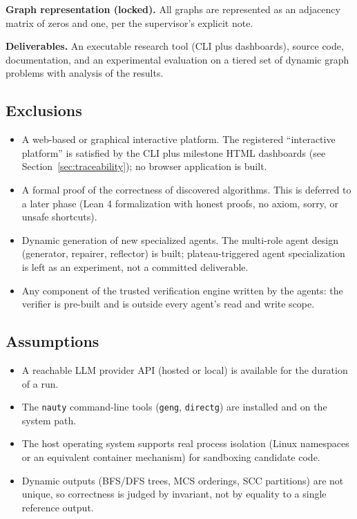 \documentclass[12pt,a4paper]{article}
\begin{document}
\textbf{Graph representation (locked).} All graphs are represented as an adjacency matrix of zeros and one, per the supervisor's explicit note.

\textbf{Deliverables.} An executable research tool (CLI plus dashboards), source code, documentation, and an experimental evaluation on a tiered set of dynamic graph problems with analysis of the results.

\subsection{Exclusions}

\begin{itemize}
  \item A web-based or graphical interactive platform. The registered ``interactive platform'' is satisfied by the CLI plus milestone HTML dashboards (see Section~\ref{sec:traceability}); no browser application is built.
  \item A formal proof of the correctness of discovered algorithms. This is deferred to a later phase (Lean 4 formalization with honest proofs, no axiom, sorry, or unsafe shortcuts).
  \item Dynamic generation of new specialized agents. The multi-role agent design (generator, repairer, reflector) is built; plateau-triggered agent specialization is left as an experiment, not a committed deliverable.
  \item Any component of the trusted verification engine written by the agents: the verifier is pre-built and is outside every agent's read and write scope.
\end{itemize}

\subsection{Assumptions}

\begin{itemize}
  \item A reachable LLM provider API (hosted or local) is available for the duration of a run.
  \item The \texttt{nauty} command-line tools (\texttt{geng}, \texttt{directg}) are installed and on the system path.
  \item The host operating system supports real process isolation (Linux namespaces or an equivalent container mechanism) for sandboxing candidate code.
  \item Dynamic outputs (BFS/DFS trees, MCS orderings, SCC partitions) are not unique, so correctness is judged by invariant, not by equality to a single reference output.
\end{itemize}
\end{document}
